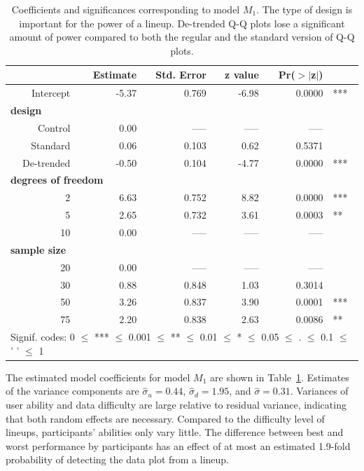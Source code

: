 \documentclass{article}\usepackage[]{graphicx}\usepackage[]{color}
\begin{document}
\begin{table}[ht]
\centering
\caption{\label{tab:model} Coefficients and significances corresponding to  model $M_1$. The type of design is important for the power of a lineup. De-trended Q-Q plots lose a significant amount of power compared to both the regular and the standard version of Q-Q plots. }
\begin{tabular}{rrrrrl}
  \hline
 &\bf Estimate &\bf Std. Error &\bf z value &\bf Pr($>$$|$z$|$) & \\ 
  \hline
  Intercept &  -5.37 & 0.769 & -6.98 & 0.0000  & *** \\ [3pt]
\multicolumn{3}{l}{\bf design} \\
   Control & 0.00 & ----- & ----- & ----- \\ 
   Standard & 0.06 & 0.103 & 0.62 & 0.5371 \\
   De-trended & -0.50 & 0.104 & -4.77 & 0.0000 & ***\\  [3pt]
\multicolumn{4}{l}{\bf degrees of freedom} \\
  2 & 6.63 & 0.752 & 8.82 & 0.0000 & ***\\ 
  5 & 2.65 & 0.732 & 3.61 & 0.0003 & **\\ 
  10 & 0.00 & ----- & ----- & ----- \\ [3pt]
\multicolumn{3}{l}{\bf sample size} \\
  20 & 0.00 & ----- & ----- & ----- \\ 
  30 & 0.88 & 0.848 & 1.03 & 0.3014 \\ 
  50  & 3.26 & 0.837 & 3.90 & 0.0001 & ***\\ 
  75 & 2.20 & 0.838 & 2.63 & 0.0086  & **\\ 
   \hline
\multicolumn{6}{l}{Signif. codes:  0 $\le$ *** $\le$ 0.001 $\le$ ** $\le$ 0.01 $\le$ * $\le$ 0.05 $\le$ . $\le$ 0.1 $\le$ ' ' $\le$ 1}
\end{tabular}
\end{table}

The estimated model coefficients for model $M_1$ are shown in Table~\ref{tab:model}. 
Estimates of the variance components are $\widehat{\sigma}_u = 0.44$, $\widehat{\sigma}_d=1.95$, and $\widehat{\sigma} = 0.31$. Variances of user ability and data difficulty are large relative to residual variance, indicating that both random effects are necessary.
%
Compared to the difficulty level of lineups, participants' abilities only vary little. The difference between best and worst performance by participants has an effect of at most an estimated 
1.9-fold probability of detecting the data plot from a lineup. 
\end{document}
